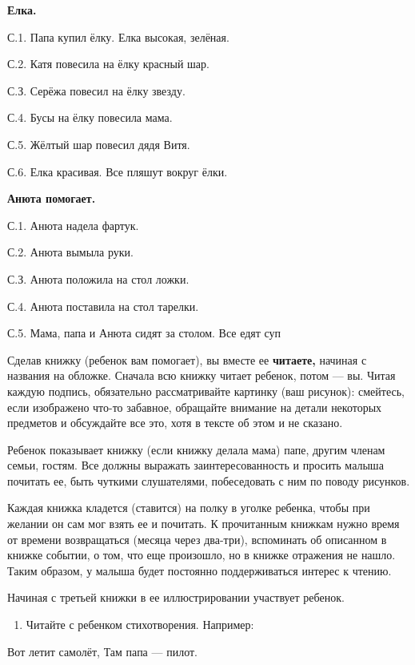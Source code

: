 \documentclass[a5paper]{book}
\begin{document}
\textbf{Елка.}

С.1. Папа купил ёлку. Елка высокая, зелёная.

С.2. Катя повесила на ёлку красный шар.

С.З. Серёжа повесил на ёлку звезду.

С.4. Бусы на ёлку повесила мама.

С.5. Жёлтый шар повесил дядя Витя.

С.6. Елка красивая. Все пляшут вокруг ёлки.

\textbf{Анюта помогает.}

С.1. Анюта надела фартук.

С.2. Анюта вымыла руки.

С.З. Анюта положила на стол ложки.

С.4. Анюта поставила на стол тарелки.

С.5. Мама, папа и Анюта сидят за столом. Все едят суп

Сделав книжку (ребенок вам помогает), вы вместе ее \textbf{читаете,}
начиная с названия на обложке. Сначала всю книжку читает ребенок, потом
--- вы. Читая каждую подпись, обязательно рассматривайте картинку (ваш
рисунок): смейтесь, если изображено что-то забавное, обращайте внимание
на детали некоторых предметов и обсуждайте все это, хотя в тексте об
этом и не сказано.

Ребенок показывает книжку (если книжку делала мама) папе, другим членам
семьи, гостям. Все должны выражать заинтересованность и просить малыша
почитать ее, быть чуткими слушателями, побеседовать с ним по поводу
рисунков.

Каждая книжка кладется (ставится) на полку в уголке ребенка, чтобы при
желании он сам мог взять ее и почитать. К прочитанным книжкам нужно
время от времени возвращаться (месяца через два-три), вспоминать об
описанном в книжке событии, о том, что еще произошло, но в книжке
отражения не нашло. Таким образом, у малыша будет постоянно
поддерживаться интерес к чтению.

Начиная с третьей книжки в ее иллюстрировании участвует ребенок.


\begin{enumerate}
\def\labelenumi{\arabic{enumi}.}
\setcounter{enumi}{4}
\item
  
  Читайте с ребенком стихотворения. Например:
  
\end{enumerate}


Вот летит самолёт, Там папа --- пилот.
\end{document}
